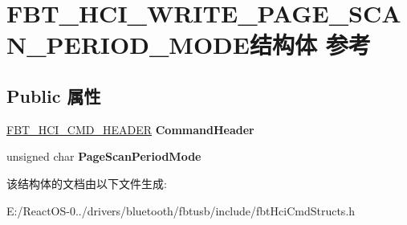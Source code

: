 \hypertarget{struct_f_b_t___h_c_i___w_r_i_t_e___p_a_g_e___s_c_a_n___p_e_r_i_o_d___m_o_d_e}{}\section{F\+B\+T\+\_\+\+H\+C\+I\+\_\+\+W\+R\+I\+T\+E\+\_\+\+P\+A\+G\+E\+\_\+\+S\+C\+A\+N\+\_\+\+P\+E\+R\+I\+O\+D\+\_\+\+M\+O\+D\+E结构体 参考}
\label{struct_f_b_t___h_c_i___w_r_i_t_e___p_a_g_e___s_c_a_n___p_e_r_i_o_d___m_o_d_e}
\subsection*{Public 属性}
\begin{DoxyCompactItemize}
\item 
\mbox{\label{struct_f_b_t___h_c_i___w_r_i_t_e___p_a_g_e___s_c_a_n___p_e_r_i_o_d___m_o_d_e_a247a1aa09527ee1ce65bbb6e6cbc144c}} 
\hyperlink{struct_f_b_t___h_c_i___c_m_d___h_e_a_d_e_r}{F\+B\+T\+\_\+\+H\+C\+I\+\_\+\+C\+M\+D\+\_\+\+H\+E\+A\+D\+ER} {\bfseries Command\+Header}
\item 
\mbox{\label{struct_f_b_t___h_c_i___w_r_i_t_e___p_a_g_e___s_c_a_n___p_e_r_i_o_d___m_o_d_e_a2d1adde5fd1d00f1831d85039306c564}} 
unsigned char {\bfseries Page\+Scan\+Period\+Mode}
\end{DoxyCompactItemize}


该结构体的文档由以下文件生成\+:\begin{DoxyCompactItemize}
\item 
E\+:/\+React\+O\+S-\/0../drivers/bluetooth/fbtusb/include/fbt\+Hci\+Cmd\+Structs.\+h\end{DoxyCompactItemize}
